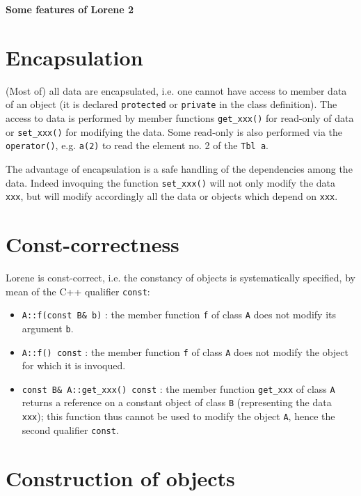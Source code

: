 \documentclass[12pt]{article}
\begin{document}
\begin{center}
\bf \LARGE Some features of {\sc Lorene 2}
\end{center}

\vspace{1cm}

\section{Encapsulation}

(Most of) all data are encapsulated, i.e. one cannot have access to
member data of an object (it is declared {\tt protected} or
{\tt private} in the class definition).
The access to data is performed by member functions {\tt get\_xxx()}
for read-only of data or {\tt set\_xxx()} for modifying the data.
Some read-only is also performed via the {\tt operator()}, e.g.
{\tt a(2)} to read the element no. 2 of the {\tt Tbl a}.

The advantage of encapsulation is a safe handling of the
dependencies among the data. Indeed invoquing the function
{\tt set\_xxx()} will not only modify the data {\tt xxx}, but will
modify accordingly all the data or objects which depend on {\tt xxx}.


\section{Const-correctness}

{\sc Lorene} is const-correct, i.e. the constancy
of objects is systematically specified, by mean of the C++ qualifier
{\tt const}:
\begin{itemize}
\item {\tt A::f(const B\& b)} : the member function {\tt f} of class
{\tt A} does not modify its argument {\tt b}.
\item {\tt A::f() const} : the member function {\tt f} of class {\tt A}
does not modify the object for which it is invoqued.
\item {\tt const B\& A::get\_xxx() const} : the member function
{\tt get\_xxx} of class {\tt A} returns a reference on a constant object
of class {\tt B} (representing the data {\tt xxx}); this
function thus cannot be used to modify the object {\tt A}, hence the
second qualifier {\tt const}.
\end{itemize}

\section{Construction of objects}
\end{document}
